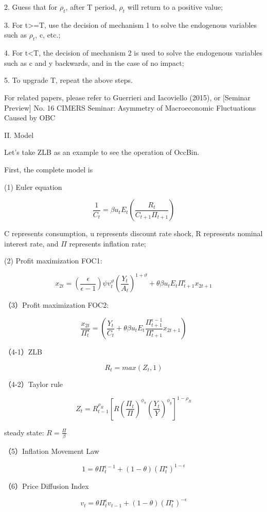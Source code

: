 \documentclass[10pt,math=newtx,citestyle=gb7714-2015,bibstyle=gb7714-2015]{elegantbook}
\begin{document}
{2. Guess that for $\rho_t$, after T period, $\rho_t$ will return to a positive value;

3. For t>=T, use the decision of mechanism 1 to solve the endogenous variables such as $\rho_t$, c, etc.;

4. For t<T, the decision of mechanism 2 is used to solve the endogenous variables such as c and y backwards, and in the case of no impact;

5. To upgrade T, repeat the above steps.


For related papers, please refer to Guerrieri and Iacoviello (2015), or [Seminar Preview] No. 16 CIMERS Seminar: Asymmetry of Macroeconomic Fluctuations Caused by OBC

II. Model

Let's take ZLB as an example to see the operation of OccBin.

First, the complete model is

     (1) Euler equation

$$\frac{1}{C_t}=\beta u_tE_t\left(\frac{R_t}{C_{t+1}\Pi_{t+1}}\right)$$

C represents consumption, u represents discount rate shock, R represents nominal interest rate, and $\Pi$ represents inflation rate;

    (2) Profit maximization FOC1:

$$x_{2t}=\left(\frac{\epsilon}{\epsilon-1}\right)\psi v_t^{\vartheta}\left(\frac{Y_t}{A_t}\right)^{1+\vartheta}+\theta\beta u_tE_t\Pi_{t+1}^{\epsilon}x_{2t+1}$$


（3）Profit maximization FOC2:

$$\frac{x_{2t}}{\Pi_t^{\star}}=\left(\frac{Y_t}{C_t}+\theta\beta u_tE_t\frac{\Pi_{t+1}^{\epsilon-1}}{\Pi_{t+1}^{\star}}x_{2t+1}\right)$$


（4-1）ZLB

$$R_t=max(Z_t,1)$$

（4-2）Taylor rule

$$Z_t=R_{t-1}^{\rho_R}\left[R\left(\frac{\Pi_t}{\Pi}\right)^{\phi_{\pi}}\left(\frac{Y_t}{Y}\right)^{\phi_y}\right]^{1-\rho_R}$$

 steady state: $R=\frac{\Pi}{\beta}$

（5）Inflation Movement Law

$$1=\theta\Pi_t^{\epsilon-1}+(1-\theta)(\Pi_t^{\star})^{1-\epsilon}$$

（6）Price Diffusion Index

$$v_t=\theta\Pi_t^{\epsilon}v_{t-1}+(1-\theta)(\Pi_t^{\star})^{-\epsilon}$$

}
\end{document}
